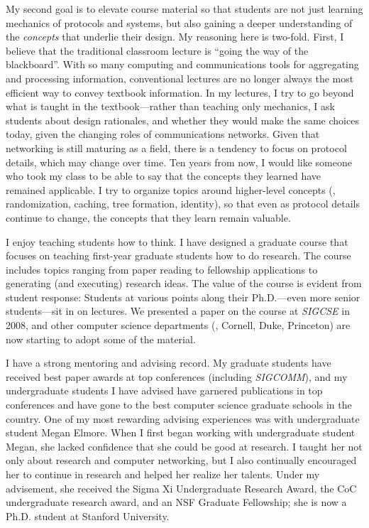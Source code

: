 My second goal is to elevate course material so that students are not
just learning mechanics of protocols and systems, but also gaining a
deeper understanding of the {\em concepts} that underlie their design.
My reasoning here is two-fold.  First, I believe that the traditional
classroom lecture is ``going the way of the blackboard''.  With so many
computing and communications tools for aggregating and processing
information, conventional lectures are no longer always the most
efficient way to convey textbook information.  In my lectures, I try to
go beyond what is taught in the textbook---rather than teaching only
mechanics, I ask students about design rationales, and whether they
would make the same choices today, given the changing roles of
communications networks.  Given that networking is still
maturing as a field, there is a tendency to focus on protocol details,
which may change over time.  Ten years from now, I would like someone
who took my class to be able to say that the concepts they learned have
remained applicable.  I try to organize topics around higher-level
concepts (\eg, randomization, caching, tree formation, identity), so
that even as protocol details continue to change, the concepts that they
learn remain valuable.

I enjoy teaching students how to think.  I have designed
a graduate course that focuses on teaching first-year graduate students
how to do research.  The course includes topics ranging from paper
reading to fellowship applications to generating (and executing)
research ideas. The value of the course is evident from student
response: Students at various points along their Ph.D.---even more
senior students---sit in on lectures.  We presented a paper on the
course at {\em SIGCSE} in 2008, and other computer science departments
(\eg, Cornell, Duke, Princeton) are now starting to adopt some of the material.

I have a strong mentoring and advising record.  My graduate students
have received best paper awards at top conferences (including {\em
SIGCOMM}), and my undergraduate students I have advised have garnered
publications in top conferences and have gone to the best computer
science graduate schools in the country.  One of my most rewarding
advising experiences was with undergraduate student Megan Elmore.  When
I first began working with undergraduate student Megan, she lacked
confidence that she could be good at research. I taught her not only
about research and computer networking, but I also continually
encouraged her to continue in research and helped her realize her
talents. Under my advisement, she received the Sigma Xi Undergraduate
Research Award, the CoC undergraduate research award, and an NSF
Graduate Fellowship; she is now a Ph.D. student at Stanford University.
